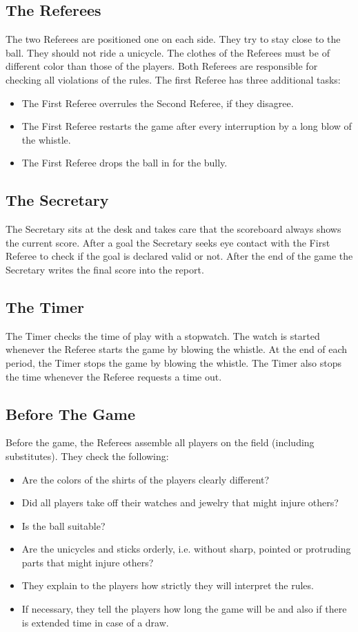 \subsection{The Referees}
The two Referees are positioned one on each side. They try to stay close to the ball. They should not ride a unicycle.
The clothes of the Referees must be of different color than those of the players. Both Referees are responsible for
checking all violations of the rules. The first Referee has three additional tasks:\\
\begin{itemize}
\item The First Referee overrules the Second Referee, if they disagree.
\item The First Referee restarts the game after every interruption by a long blow of the whistle.
\item The First Referee drops the ball in for the bully.
\end{itemize}

\subsection{The Secretary}
The Secretary sits at the desk and takes care that the scoreboard always shows the current score. After a goal the
Secretary seeks eye contact with the First Referee to check if the goal is declared valid or not. After the end of the
game the Secretary writes the final score into the report.

\subsection{The Timer}
The Timer checks the time of play with a stopwatch. The watch is started whenever the Referee starts the game by
blowing the whistle. At the end of each period, the Timer stops the game by blowing the whistle. The Timer also stops
the time whenever the Referee requests a time out.

\subsection{Before The Game}
Before the game, the Referees assemble all players on the field (including substitutes). They check the following:\\
\begin{itemize}
\item Are the colors of the shirts of the players clearly different?
\item Did all players take off their watches and jewelry that might injure others?
\item Is the ball suitable?
\item Are the unicycles and sticks orderly, i.e. without sharp, pointed or protruding parts that might injure others?
\item They explain to the players how strictly they will interpret the rules.
\item If necessary, they tell the players how long the game will be and also if there is extended time in case of a
draw.
\end{itemize}

